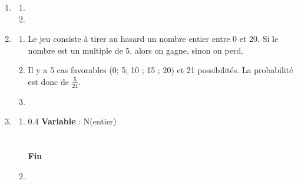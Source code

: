 \begin{enumerate}[label=\thechapter.\arabic*., font=\bfseries, itemsep=10mm,labelsep*=3mm,left=0mm]
\item
\begin{enumerate}[label=\alph*),left=0mm,itemsep=1mm]
\item \begin{minipage}[t][][b]{1\textwidth}
\end{minipage}
\item \begin{minipage}[t][][b]{1\textwidth}
\end{minipage}
\end{enumerate}



\item
\begin{enumerate}[label=\alph*),left=0mm,itemsep=1mm]
\item Le jeu consiste à tirer au hasard un nombre entier entre 0 et 20. Si le nombre est un multiple de 5, alors on gagne, sinon on perd.
\item Il y a 5 cas favorables (0; 5; 10 ; 15 ; 20) et 21 possibilités. La probabilité est donc de $\frac{5}{21}$.
\item \begin{minipage}[t][][b]{1\textwidth}
\end{minipage}
\end{enumerate}
\clearpage



\item
\begin{enumerate}[label=\alph*),left=0mm,itemsep=1mm]
\item \begin{minipage}[t][][b]{1\textwidth}
\begin{affichagealgorithme}{0.4}
\textbf{Variable} : N(entier)\\
\\
\\
\textbf{Fin}
\end{affichagealgorithme}\end{minipage}
\item \begin{minipage}[t][][b]{1\textwidth}
\end{minipage}
\end{enumerate}




\end{enumerate}
